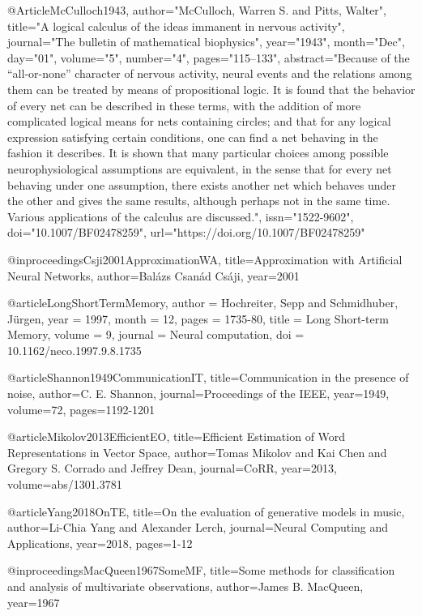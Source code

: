 @Article{McCulloch1943,
author="McCulloch, Warren S.
and Pitts, Walter",
title="A logical calculus of the ideas immanent in nervous activity",
journal="The bulletin of mathematical biophysics",
year="1943",
month="Dec",
day="01",
volume="5",
number="4",
pages="115--133",
abstract="Because of the ``all-or-none'' character of nervous activity, neural events and the relations among them can be treated by means of propositional logic. It is found that the behavior of every net can be described in these terms, with the addition of more complicated logical means for nets containing circles; and that for any logical expression satisfying certain conditions, one can find a net behaving in the fashion it describes. It is shown that many particular choices among possible neurophysiological assumptions are equivalent, in the sense that for every net behaving under one assumption, there exists another net which behaves under the other and gives the same results, although perhaps not in the same time. Various applications of the calculus are discussed.",
issn="1522-9602",
doi="10.1007/BF02478259",
url="https://doi.org/10.1007/BF02478259"
}

@inproceedings{Csji2001ApproximationWA,
  title={Approximation with Artificial Neural Networks},
  author={Bal{\'a}zs Csan{\'a}d Cs{\'a}ji},
  year={2001}
}

@article{LongShortTermMemory,
author = {Hochreiter, Sepp and Schmidhuber, Jürgen},
year = {1997},
month = {12},
pages = {1735-80},
title = {Long Short-term Memory},
volume = {9},
journal = {Neural computation},
doi = {10.1162/neco.1997.9.8.1735}
}

@article{Shannon1949CommunicationIT,
  title={Communication in the presence of noise},
  author={C. E. Shannon},
  journal={Proceedings of the IEEE},
  year={1949},
  volume={72},
  pages={1192-1201}
}

@article{Mikolov2013EfficientEO,
  title={Efficient Estimation of Word Representations in Vector Space},
  author={Tomas Mikolov and Kai Chen and Gregory S. Corrado and Jeffrey Dean},
  journal={CoRR},
  year={2013},
  volume={abs/1301.3781}
}

@article{Yang2018OnTE,
  title={On the evaluation of generative models in music},
  author={Li-Chia Yang and Alexander Lerch},
  journal={Neural Computing and Applications},
  year={2018},
  pages={1-12}
}

@inproceedings{MacQueen1967SomeMF,
  title={Some methods for classification and analysis of multivariate observations},
  author={James B. MacQueen},
  year={1967}
}

